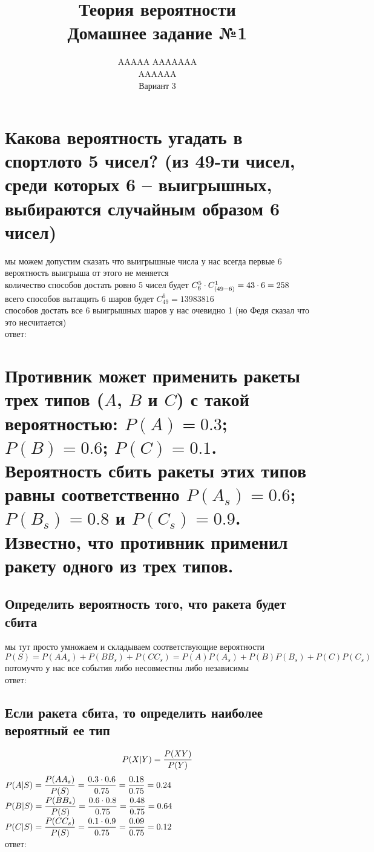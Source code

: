 \documentclass{article}
\title{Теория вероятности \\ Домашнее задание №1}
\author{AAAAA AAAAAAA \\ AAAAAA \\ Вариант 3}
\begin{document}
  \maketitle

  \section{Какова вероятность угадать в спортлото 5 чисел? (из 49-ти чисел, среди которых 6 -- выигрышных, выбираются случайным образом 6 чисел)}
  мы можем допустим сказать что выигрышные числа у нас всегда первые 6 \\
  вероятность выигрыша от этого не меняется \\
  количество способов достать ровно 5 чисел будет $C^5_6 \cdot C^1_{\left(49-6\right)} = 43 \cdot 6 = 258$ \\
  всего способов вытащить 6 шаров будет $C^6_{49} = 13983816$ \\
  способов достать все 6 выигрышных шаров у нас очевидно 1 (но Федя сказал что это несчитается) \\
  ответ: 


  \section{Противник может применить ракеты трех типов ($A$, $B$ и $C$) с такой вероятностью: $P(A) = 0.3$; $P(B) = 0.6$; $P(C) = 0.1$. Вероятность сбить ракеты этих типов равны соответственно $P(A_s) = 0.6$; $P(B_s) = 0.8$ и $P(C_s) = 0.9$. Известно, что противник применил ракету одного из трех типов.}

  \subsection{Определить вероятность того, что ракета будет сбита}
  мы тут просто умножаем и складываем соответствующие вероятности \\
  $P(S) = P(AA_s) + P(BB_s) + P(CC_s) = P(A)P(A_s) + P(B)P(B_s) + P(C)P(C_s)$ \\
  потомучто у нас все события либо несовместны либо независимы \\
  ответ: 

  \subsection{Если ракета сбита, то определить наиболее вероятный ее тип}
  $$ P(X|Y) = \frac{P(XY)}{P(Y)} $$
  $\displaystyle P(A|S) = \frac{P(AA_s)}{P(S)} = \frac{0.3 \cdot 0.6}{0.75} = \frac{0.18}{0.75} = 0.24$ \\
  $\displaystyle P(B|S) = \frac{P(BB_s)}{P(S)} = \frac{0.6 \cdot 0.8}{0.75} = \frac{0.48}{0.75} = 0.64$ \\
  $\displaystyle P(C|S) = \frac{P(CC_s)}{P(S)} = \frac{0.1 \cdot 0.9}{0.75} = \frac{0.09}{0.75} = 0.12$ \\
  ответ: 
\end{document}

